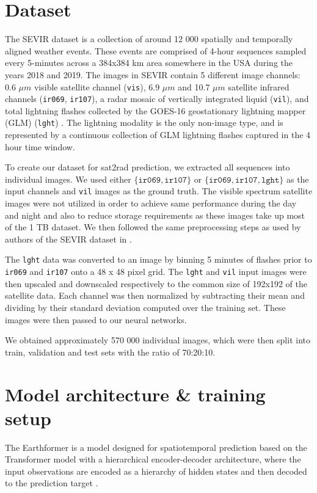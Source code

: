 \documentclass[english]{mvi-report}
\begin{document}
\section{Dataset}
The SEVIR dataset is a collection of around 12 000 spatially and temporally aligned weather events. These events are comprised of 4-hour sequences sampled every 5-minutes across a 384x384 km area somewhere in the USA during the years 2018 and 2019. The images in SEVIR contain 5 different image channels: 0.6 $\mu m$ visible satellite channel (\texttt{vis}), 6.9 $\mu m$ and 10.7 $\mu m$ satellite infrared channels (\texttt{ir069}, \texttt{ir107}), a radar mosaic of vertically integrated liquid (\texttt{vil}), and total lightning flashes collected by the GOES-16 geostationary lightning mapper (GLM) (\texttt{lght}) \cite{SEVIR}. The lightning modality is the only non-image type, and is represented by a continuous collection of GLM lightning flashes captured in the 4 hour time window.

To create our dataset for sat2rad prediction, we extracted all sequences into individual images. We used either $\{\texttt{ir069}, \texttt{ir107}\}$ or $\{\texttt{ir069}, \texttt{ir107}, \texttt{lght}\}$ as the input channels and \texttt{vil} images as the ground truth. The visible spectrum satellite images were not utilized in order to achieve same performance during the day and night and also to reduce storage requirements as these images take up most of the 1 TB dataset. We then followed the same preprocessing steps as used by authors of the SEVIR dataset in \cite{SEVIR}.

The \texttt{lght} data was converted to an image by binning 5 minutes of flashes prior to \texttt{ir069} and \texttt{ir107} onto a 48 x 48 pixel grid. The \texttt{lght} and \texttt{vil} input images were then upscaled and downscaled respectively to the common size of 192x192 of the satellite data. Each channel was then normalized by subtracting their mean and dividing by their standard deviation computed over the training set. These images were then passed to our neural networks.

We obtained approximately 570 000 individual images, which were then split into train, validation and test sets with the ratio of 70:20:10.

\section{Model architecture \& training setup}
The Earthformer is a model designed for spatiotemporal prediction based on the Transformer model with a hierarchical encoder-decoder architecture, where the input observations are encoded as a hierarchy of hidden states and then decoded to the prediction target \cite{earthformer}.
\end{document}
